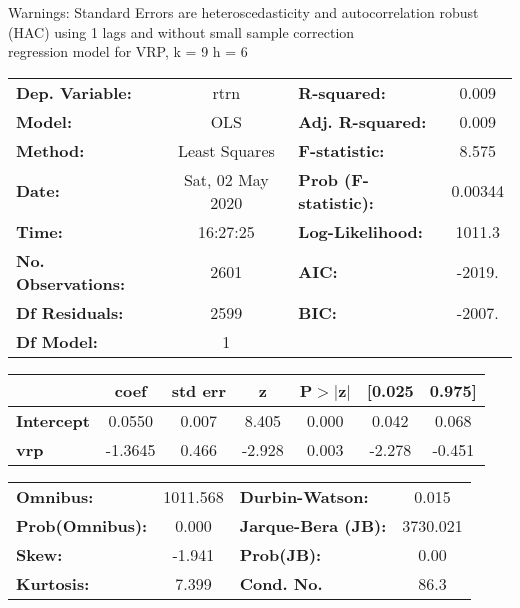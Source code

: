 Warnings: \newline
 [1] Standard Errors are heteroscedasticity and autocorrelation robust (HAC) using 1 lags and without small sample correction\\ 

regression model for VRP, k = 9 h = 6\begin{center}
\begin{tabular}{lclc}
\toprule
\textbf{Dep. Variable:}    &       rtrn       & \textbf{  R-squared:         } &     0.009   \\
\textbf{Model:}            &       OLS        & \textbf{  Adj. R-squared:    } &     0.009   \\
\textbf{Method:}           &  Least Squares   & \textbf{  F-statistic:       } &     8.575   \\
\textbf{Date:}             & Sat, 02 May 2020 & \textbf{  Prob (F-statistic):} &  0.00344    \\
\textbf{Time:}             &     16:27:25     & \textbf{  Log-Likelihood:    } &    1011.3   \\
\textbf{No. Observations:} &        2601      & \textbf{  AIC:               } &    -2019.   \\
\textbf{Df Residuals:}     &        2599      & \textbf{  BIC:               } &    -2007.   \\
\textbf{Df Model:}         &           1      & \textbf{                     } &             \\
\bottomrule
\end{tabular}
\begin{tabular}{lcccccc}
                   & \textbf{coef} & \textbf{std err} & \textbf{z} & \textbf{P$> |$z$|$} & \textbf{[0.025} & \textbf{0.975]}  \\
\midrule
\textbf{Intercept} &       0.0550  &        0.007     &     8.405  &         0.000        &        0.042    &        0.068     \\
\textbf{vrp}       &      -1.3645  &        0.466     &    -2.928  &         0.003        &       -2.278    &       -0.451     \\
\bottomrule
\end{tabular}
\begin{tabular}{lclc}
\textbf{Omnibus:}       & 1011.568 & \textbf{  Durbin-Watson:     } &    0.015  \\
\textbf{Prob(Omnibus):} &   0.000  & \textbf{  Jarque-Bera (JB):  } & 3730.021  \\
\textbf{Skew:}          &  -1.941  & \textbf{  Prob(JB):          } &     0.00  \\
\textbf{Kurtosis:}      &   7.399  & \textbf{  Cond. No.          } &     86.3  \\
\bottomrule
\end{tabular}
\end{center}

